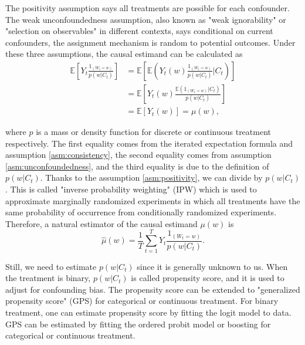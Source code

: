 \documentclass[12pt]{article}
\begin{document}
The positivity assumption says all treatments are possible for each confounder.
The weak unconfoundedness assumption, 
also known as "weak ignorability" or "selection on observables" in different contexts, says
conditional on current confounders, the assignment mechanism is random to potential outcomes.
Under these three assumptions, the causal estimand can be calculated as
\begin{equation}
	\begin{split}
		\mathbb{E}\left[ Y_t\frac{1_{(W_t = w)}}{p(w\lvert C_t)} \right]
		& = \mathbb{E}\left[ \mathbb{E}\left( Y_t(w) \frac{1_{(W_t = w)}}{p(w\lvert C_t)} \lvert C_t\right)\right]\\
		& = \mathbb{E}\left[ Y_t(w)\frac{\mathbb{E}\left( 1_{(W_t = w)}\lvert C_t \right)}{p(w\lvert C_t)} \right]\\
		& = \mathbb{E}\left[ Y_t(w) \right] = \mu(w),
	\end{split}
	\label{eqn:ipw}
\end{equation}

where $p$ is a mass or density function for discrete or continuous treatment respectively.
The first equality comes from the iterated expectation formula and assumption \ref{asm:consistency},
the second equality comes from assumption \ref{asm:unconfoundedness},
and the third equality is due to the definition of $p(w\lvert C_t)$.
Thanks to the assumption \ref{asm:positivity}, we can divide by $p(w\lvert C_t)$.
This is called "inverse probability weighting" (IPW)
which is used to approximate marginally randomized experiments
in which all treatments have the same probability of occurrence
from conditionally randomized experiments.
Therefore, a natural estimator of the causal estimand $\mu(w)$ is
\begin{equation}
	\hat{\mu}(w) = \frac{1}{T}\sum_{t = 1}^T Y_t \frac{1_{(W_t = w)}}{p(w\lvert C_t)}.
	\label{eqn:htestimator}
\end{equation}
	

Still, we need to estimate $p(w\lvert C_t)$ since it is generally unknown to us.
When the treatment is binary, $p(w\lvert C_t)$ is called propensity score,
and it is used to adjust for confounding bias\cite{rosenbaum1983}.
The propensity score can be extended to 
"generalized propensity score" (GPS) for categorical or continuous treatment\cite{imbens2000}.
For binary treatment, one can estimate propensity score by fitting the logit model to data.
GPS can be estimated by fitting the ordered probit model or boosting for categorical or continuous treatment.
\end{document}
